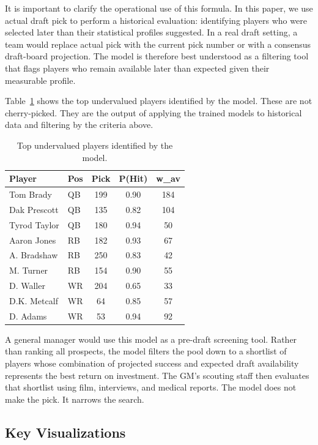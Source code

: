 \documentclass[10pt,twocolumn]{article}
\begin{document}
It is important to clarify the operational use of this formula. In this paper, we use actual draft pick to perform a historical evaluation: identifying players who were selected later than their statistical profiles suggested. In a real draft setting, a team would replace actual pick with the current pick number or with a consensus draft-board projection. The model is therefore best understood as a filtering tool that flags players who remain available later than expected given their measurable profile.

Table~\ref{tab:value} shows the top undervalued players identified by the model. These are not cherry-picked. They are the output of applying the trained models to historical data and filtering by the criteria above.

\begin{table}[H]
\centering
\small
\begin{tabular}{llccc}
\toprule
Player & Pos & Pick & P(Hit) & w\_av \\
\midrule
Tom Brady & QB & 199 & 0.90 & 184 \\
Dak Prescott & QB & 135 & 0.82 & 104 \\
Tyrod Taylor & QB & 180 & 0.94 & 50 \\
Aaron Jones & RB & 182 & 0.93 & 67 \\
A. Bradshaw & RB & 250 & 0.83 & 42 \\
M. Turner & RB & 154 & 0.90 & 55 \\
D. Waller & WR & 204 & 0.65 & 33 \\
D.K. Metcalf & WR & 64 & 0.85 & 57 \\
D. Adams & WR & 53 & 0.94 & 92 \\
\bottomrule
\end{tabular}
\caption{Top undervalued players identified by the model.}
\label{tab:value}
\end{table}

A general manager would use this model as a pre-draft screening tool. Rather than ranking all prospects, the model filters the pool down to a shortlist of players whose combination of projected success and expected draft availability represents the best return on investment. The GM's scouting staff then evaluates that shortlist using film, interviews, and medical reports. The model does not make the pick. It narrows the search.

\subsection{Key Visualizations}
\end{document}

